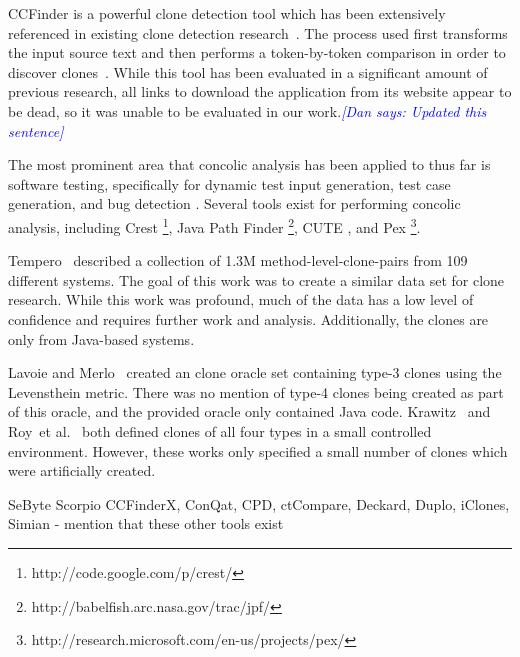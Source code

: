 \documentclass[smallextended]{svjour3}       %
\newcommand{\dan}[1]{\textcolor{blue}{{\it [Dan says: #1]}}}
\begin{document}
CCFinder is a powerful clone detection tool which has been extensively referenced in existing clone detection research~\cite{Kamiya:2001:MST:381473.381749,Choi:2011:ECC:1985404.1985407,Hotta:2010:DCM:1862372.1862390}. The process used first transforms the input source text and then performs a token-by-token comparison in order to discover clones~\cite{Kamiya:2002:CMT:636188.636191}. While this tool has been evaluated in a significant amount of previous research, all links to download the application from its website appear to be dead, so it was unable to be evaluated in our work.\dan{Updated this sentence}

The most prominent area that concolic analysis has been applied to thus far is software testing, specifically for dynamic test input generation, test case generation, and bug detection \cite{Wassermann:2008:DTI:1390630.1390661, Sen:2005:CCU:1081706.1081750, Kim:2012:IAC:2337223.2337373}. Several tools exist for performing concolic analysis, including Crest \footnote{http://code.google.com/p/crest/}, Java Path Finder \footnote{http://babelfish.arc.nasa.gov/trac/jpf/}, CUTE \cite{Sen:2005:CCU:1081706.1081750}, and Pex \footnote{http://research.microsoft.com/en-us/projects/pex/}.

Tempero~\cite{IWSC13p53} described a collection of 1.3M method-level-clone-pairs from 109 different systems. The goal of this work was to create a similar data set for clone research. While this work was profound, much of the data has a low level of confidence and requires further work and analysis. Additionally, the clones are only from Java-based systems.

Lavoie and Merlo~\cite{Lavoie:2011:ATC:1985404.1985411} created an clone oracle set containing type-3 clones using the Levensthein metric. There was no mention of type-4 clones being created as part of this oracle, and the provided oracle only contained Java code. Krawitz~\cite{Kraw2012} and Roy~et al.~\cite{Roy:2009:CEC:1530898.1531101} both defined clones of all four types in a small controlled environment. However, these works only specified a small number of clones which were artificially created.


SeByte
Scorpio
CCFinderX, ConQat, CPD, ctCompare, Deckard, Duplo, iClones, Simian - mention that these other tools exist



\end{document}
